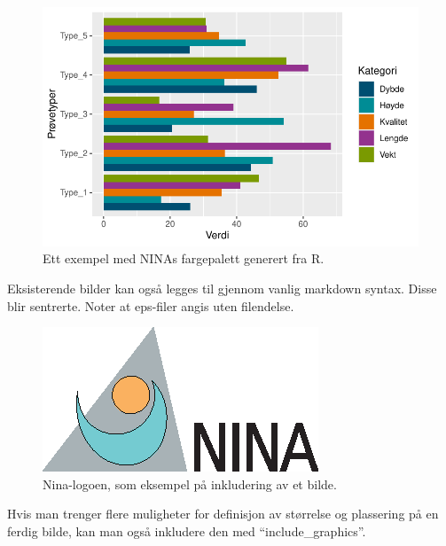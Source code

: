 \documentclass[11pt, a4paper]{article}
\begin{document}
\begin{figure}[H]

\includegraphics{quarto_ninareport_files/figure-pdf/test-chunk3-1.pdf} \hfill{}

\caption{Ett exempel med NINAs fargepalett generert fra R.
\label{xy_plot}}

\end{figure}

Eksisterende bilder kan også legges til gjennom vanlig markdown syntax.
Disse blir sentrerte. Noter at eps-filer angis uten filendelse.

\begin{figure}

{\centering \includegraphics{logo.eps}

}

\caption{Nina-logoen, som eksempel på inkludering av et bilde.
\label{logoen}}

\end{figure}

Hvis man trenger flere muligheter for definisjon av størrelse og
plassering på en ferdig bilde, kan man også inkludere den med
``include\_graphics''.
\end{document}
